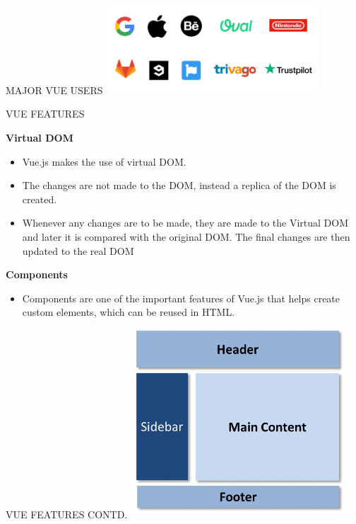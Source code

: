 \documentclass[aspectratio=169, 169]{beamer}
\newcommand\myheading[1]{%
  \par\bigskip
  {\Large\bfseries#1}\par\smallskip}
\begin{document}
\begin{frame}{MAJOR VUE USERS}
 \center\includegraphics[width=8cm]{vue2.png}
\end{frame}
\begin{frame}{VUE FEATURES}
\myheading{Virtual DOM}
\begin{itemize}
    \item Vue.js makes the use of virtual DOM. 
    \item The changes are not made to the DOM, instead a replica of the DOM is created.
    \item  Whenever any changes are to be made, they are made to the Virtual DOM and later it is compared with the original DOM. The final changes are then updated to the real DOM
\end{itemize}
\myheading{Components}
 \begin{itemize}
     \item Components are one of the important features of Vue.js that helps create custom elements, which can be reused in HTML.
 \end{itemize}

\end{frame}
\begin{frame}{VUE FEATURES CONTD.}
 \center\includegraphics[width=8cm]{Components.jpg}
\end{frame}
\end{document}
